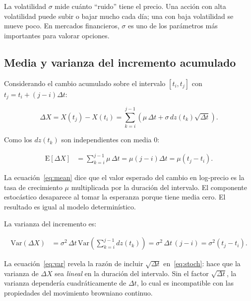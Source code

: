 \documentclass[12pt]{article}
\begin{document}
\begin{intuicion}
La volatilidad $\sigma$ mide cu\'anto ``ruido'' tiene el precio. Una acci\'on
con alta volatilidad puede subir o bajar mucho cada d\'ia; una con baja volatilidad
se mueve poco. En mercados financieros, $\sigma$ es uno de los par\'ametros
m\'as importantes para valorar opciones.
\end{intuicion}

\subsection{Media y varianza del incremento acumulado}

Considerando el cambio acumulado sobre el intervalo $[t_i, t_j]$ con
$t_j = t_i + (j-i)\Delta t$:

\begin{equation}
  \Delta X = X(t_j) - X(t_i) = \sum_{k=i}^{j-1}\left(\mu\,\Delta t + \sigma\,dz(t_k)\sqrt{\Delta t}\right).
  \label{eq:accum}
\end{equation}

Como los $dz(t_k)$ son independientes con media $0$:

\begin{align}
  \mathrm{E}[\Delta X] &= \sum_{k=i}^{j-1} \mu\,\Delta t
                        = \mu(j-i)\Delta t = \mu(t_j - t_i).
  \label{eq:mean}
\end{align}

\begin{intuicionmat}
La ecuaci\'on~\eqref{eq:mean} dice que el valor esperado del cambio en log-precio
es la tasa de crecimiento $\mu$ multiplicada por la duraci\'on del intervalo.
El componente estoc\'astico desaparece al tomar la esperanza porque tiene media
cero. El resultado es igual al modelo determin\'istico.
\end{intuicionmat}

La varianza del incremento es:

\begin{align}
  \mathrm{Var}(\Delta X) &= \sigma^2\,\Delta t\,\mathrm{Var}\!\left(\sum_{k=i}^{j-1} dz(t_k)\right)
                          = \sigma^2\,\Delta t\,(j-i)
                          = \sigma^2(t_j - t_i).
  \label{eq:var}
\end{align}

\begin{intuicionmat}
La ecuaci\'on~\eqref{eq:var} revela la raz\'on de incluir $\sqrt{\Delta t}$
en~\eqref{eq:stoch}: hace que la varianza de $\Delta X$ sea \emph{lineal} en
la duraci\'on del intervalo. Sin el factor $\sqrt{\Delta t}$, la varianza
depender\'ia cuadr\'aticamente de $\Delta t$, lo cual es incompatible con las
propiedades del movimiento browniano continuo.
\end{intuicionmat}
\end{document}
